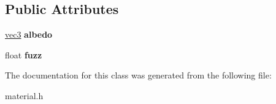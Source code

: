 \subsection*{Public Attributes}
\begin{DoxyCompactItemize}
\item 
\mbox{\label{classmetal_a7c16624a6f180f58c3bda5558c71e7c1}} 
\hyperlink{classvec3}{vec3} {\bfseries albedo}
\item 
\mbox{\label{classmetal_a7b1a155f70bf086fc84c4c17d1e6f88c}} 
float {\bfseries fuzz}
\end{DoxyCompactItemize}


The documentation for this class was generated from the following file\+:\begin{DoxyCompactItemize}
\item 
material.\+h\end{DoxyCompactItemize}
